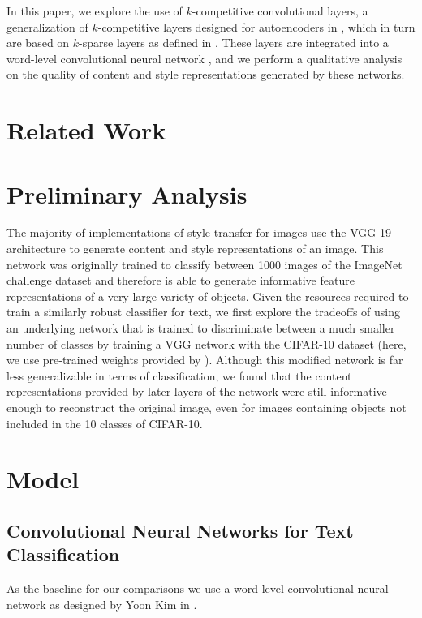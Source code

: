 \documentclass{vldb}
\begin{document}
In this paper, we explore the use of $k$-competitive convolutional layers, a generalization of $k$-competitive layers designed for autoencoders in \cite{KATE}, which in turn are based on $k$-sparse layers as defined in \cite{MakhzaniF13}. These layers are integrated into a word-level convolutional neural network \cite{Kim14f}, and we perform a qualitative analysis on the quality of content and style representations generated by these networks.

\section{Related Work}

\section{Preliminary Analysis}
The majority of implementations of style transfer for images use the VGG-19 \cite{VGG19} architecture to generate content and style representations of an image. This network was originally trained to classify between 1000 images of the ImageNet challenge dataset \cite{ILSVRC15} and therefore is able to generate informative feature representations of a very large variety of objects. Given the resources required to train a similarly robust classifier for text, we first explore the tradeoffs of using an underlying network that is trained to discriminate between a much smaller number of classes by training a VGG network with the CIFAR-10 dataset \cite{Krizhevsky09} (here, we use pre-trained weights provided by \cite{Liu15}). Although this modified network is far less generalizable in terms of classification, we found that the content representations provided by later layers of the network were still informative enough to reconstruct the original image, even for images containing objects not included in the 10 classes of CIFAR-10. 

\section{Model}
\subsection{Convolutional Neural Networks for Text Classification}
As the baseline for our comparisons we use a word-level convolutional neural network as designed by Yoon Kim in \cite{Kim14f}. 
\end{document}
